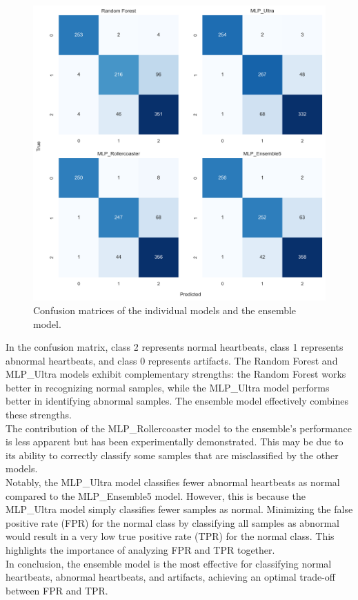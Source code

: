 \begin{figure}[H]
    \centering
    \includegraphics[width=\columnwidth]{./images/confmat_ensemble_vs_individual.png}
    \caption{Confusion matrices of the individual models and the ensemble model.}
    \label{fig:confmat_ensemble_vs_individual}
\end{figure}
\noindent
In the confusion matrix, class 2 represents normal heartbeats, class 1 represents abnormal heartbeats, and 
class 0 represents artifacts. The Random Forest and MLP\_Ultra models exhibit complementary strengths: the 
Random Forest works better in recognizing normal samples, while the MLP\_Ultra model performs better in 
identifying abnormal samples. The ensemble model effectively combines these strengths.\\
The contribution of the MLP\_Rollercoaster model to the ensemble’s performance is less apparent but has been 
experimentally demonstrated. This may be due to its ability to correctly classify some samples that are 
misclassified by the other models.\\
Notably, the MLP\_Ultra model classifies fewer abnormal heartbeats as normal compared to the MLP\_Ensemble5 
model. However, this is because the MLP\_Ultra model simply classifies fewer samples as normal. Minimizing 
the false positive rate (FPR) for the normal class by classifying all samples as abnormal would result in a very 
low true positive rate (TPR) for the normal class. This highlights the importance of analyzing FPR and TPR together.\\
In conclusion, the ensemble model is the most effective for classifying normal heartbeats, abnormal heartbeats, 
and artifacts, achieving an optimal trade-off between FPR and TPR.